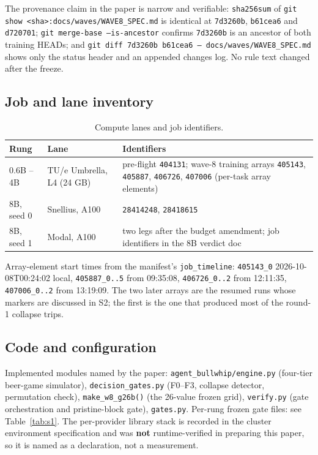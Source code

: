 \documentclass[11pt,a4paper]{article}
\begin{document}
\noindent The provenance claim in the paper is narrow and verifiable: \texttt{sha256sum} of
\texttt{git show <sha>:docs/waves/WAVE8\_SPEC.md} is identical at \texttt{7d3260b}, \texttt{b61cea6}
and \texttt{d720701}; \texttt{git merge-base --is-ancestor} confirms \texttt{7d3260b} is an ancestor
of both training HEADs; and \texttt{git diff 7d3260b b61cea6 -- docs/waves/WAVE8\_SPEC.md} shows only
the status header and an appended changes log. No rule text changed after the freeze.

\subsection*{Job and lane inventory}

\begin{table}[h]
\centering
\small
\caption{Compute lanes and job identifiers.}
\label{tab:s5b}
\begin{tabular}{@{}p{2.0cm}p{2.6cm}p{8.0cm}@{}}
\toprule
\textbf{Rung} & \textbf{Lane} & \textbf{Identifiers} \\
\midrule
0.6B -- 4B & TU/e Umbrella, L4 (24 GB) & pre-flight \texttt{404131}; wave-8 training arrays
\texttt{405143}, \texttt{405887}, \texttt{406726}, \texttt{407006} (per-task array elements) \\
8B, seed 0 & Snellius, A100 & \texttt{28414248}, \texttt{28418615} \\
8B, seed 1 & Modal, A100 & two legs after the budget amendment; job identifiers in the 8B verdict doc \\
\bottomrule
\end{tabular}
\end{table}

\noindent Array-element start times from the manifest's \texttt{job\_timeline}: \texttt{405143\_0}
2026-10-08T00:24:02 local, \texttt{405887\_0..5} from 09:35:08, \texttt{406726\_0..2} from 12:11:35,
\texttt{407006\_0..2} from 13:19:09. The two later arrays are the resumed runs whose markers are
discussed in S2; the first is the one that produced most of the round-1 collapse trips.

\subsection*{Code and configuration}

Implemented modules named by the paper: \texttt{agent\_bullwhip/engine.py} (four-tier beer-game
simulator), \texttt{decision\_gates.py} (F0--F3, collapse detector, permutation check),
\texttt{make\_w8\_g26b()} (the 26-value frozen grid), \texttt{verify.py} (gate orchestration and
pristine-block gate), \texttt{gates.py}. Per-rung frozen gate files: see Table~\ref{tab:s1}. The
per-provider library stack is recorded in the cluster environment specification and was
\textbf{not} runtime-verified in preparing this paper, so it is named as a declaration, not a
measurement.
\end{document}

